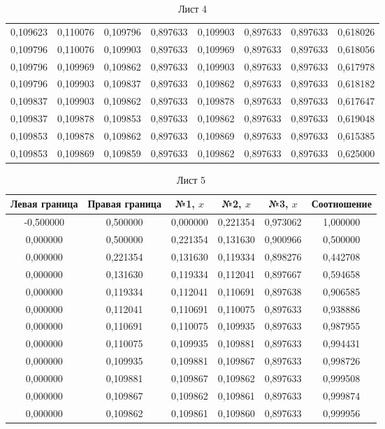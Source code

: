 \begin{table}
\begin{tabular}{cccccccc}
0,109623  & 0,110076 & 0,109796  & 0,897633 & 0,109903 & 0,897633 & 0,897633 & 0,618026 \\
0,109796  & 0,110076 & 0,109903  & 0,897633 & 0,109969 & 0,897633 & 0,897633 & 0,618056 \\
0,109796  & 0,109969 & 0,109862  & 0,897633 & 0,109903 & 0,897633 & 0,897633 & 0,617978 \\
0,109796  & 0,109903 & 0,109837  & 0,897633 & 0,109862 & 0,897633 & 0,897633 & 0,618182 \\
0,109837  & 0,109903 & 0,109862  & 0,897633 & 0,109878 & 0,897633 & 0,897633 & 0,617647 \\
0,109837  & 0,109878 & 0,109853  & 0,897633 & 0,109862 & 0,897633 & 0,897633 & 0,619048 \\
0,109853  & 0,109878 & 0,109862  & 0,897633 & 0,109869 & 0,897633 & 0,897633 & 0,615385 \\
0,109853  & 0,109869 & 0,109859  & 0,897633 & 0,109862 & 0,897633 & 0,897633 & 0,625000 \\
\bottomrule
\end{tabular}
\caption{Лист 4}
\end{table}



\begin{table}
\center
\begin{tabular}{cccccc}
\toprule
Левая граница & Правая граница 
& №1, $x$ & №2, $x$ & №3, $x$ 
  & Соотношение \\
\midrule
-0,500000 & 0,500000 & 0,000000 & 0,221354 & 0,973062 & 1,000000 \\
0,000000  & 0,500000 & 0,221354 & 0,131630 & 0,900966 & 0,500000 \\
0,000000  & 0,221354 & 0,131630 & 0,119334 & 0,898276 & 0,442708 \\
0,000000  & 0,131630 & 0,119334 & 0,112041 & 0,897667 & 0,594658 \\
0,000000  & 0,119334 & 0,112041 & 0,110691 & 0,897638 & 0,906585 \\
0,000000  & 0,112041 & 0,110691 & 0,110075 & 0,897633 & 0,938886 \\
0,000000  & 0,110691 & 0,110075 & 0,109935 & 0,897633 & 0,987955 \\
0,000000  & 0,110075 & 0,109935 & 0,109881 & 0,897633 & 0,994431 \\
0,000000  & 0,109935 & 0,109881 & 0,109867 & 0,897633 & 0,998726 \\
0,000000  & 0,109881 & 0,109867 & 0,109862 & 0,897633 & 0,999508 \\
0,000000  & 0,109867 & 0,109862 & 0,109861 & 0,897633 & 0,999874 \\
0,000000  & 0,109862 & 0,109861 & 0,109860 & 0,897633 & 0,999956 \\
\bottomrule
\end{tabular}
\caption{Лист 5}
\end{table}

